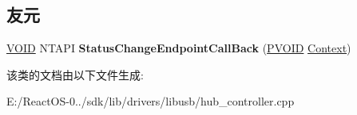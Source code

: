\subsection*{友元}
\begin{DoxyCompactItemize}
\item 
\mbox{\label{class_c_hub_controller_acfcf77898f574f76366474ab6ef6025d}} 
\hyperlink{interfacevoid}{V\+O\+ID} N\+T\+A\+PI {\bfseries Status\+Change\+Endpoint\+Call\+Back} (\hyperlink{interfacevoid}{P\+V\+O\+ID} \hyperlink{struct_context}{Context})
\end{DoxyCompactItemize}


该类的文档由以下文件生成\+:\begin{DoxyCompactItemize}
\item 
E\+:/\+React\+O\+S-\/0../sdk/lib/drivers/libusb/hub\+\_\+controller.\+cpp\end{DoxyCompactItemize}
